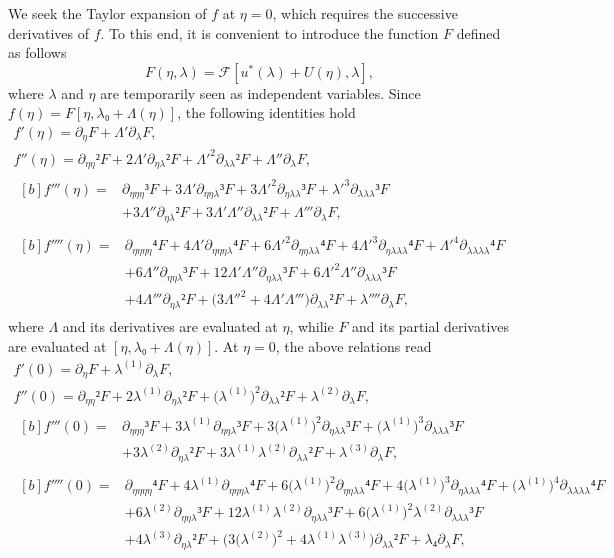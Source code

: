 \documentclass[12pt, final]{scrartcl}
\theoremstyle{definition}
\newcommand{\order}[2][1]{#2^{(#1)}}
\begin{document}
We seek the Taylor expansion of \(f\) at \(η = 0\), which requires the
successive derivatives of \(f\). To this end, it is convenient to introduce the
function \(F\) defined as follows
\begin{equation*}
  F(η, λ) =\mathcal{F}[u^{\ast}(λ) + U(η), λ],
\end{equation*}
where \(λ\) and \(η\) are temporarily seen as independent variables. Since
\(f(η) = F[η, λ₀ + Λ(η)]\), the following identities hold
\begin{gather*}
  f'(η) = ∂_{η} F + Λ' ∂_{λ} F,\\
  f''(η) = ∂_{ηη}² F + 2Λ' ∂_{ηλ}²F + Λ'^2 ∂_{λλ}² F + Λ'' ∂_{λ} F,\\
  \begin{aligned}[b]
    f'''(η) ={}
    & ∂_{ηηη}³ F + 3Λ' ∂_{ηηλ}³F + 3Λ'^2 ∂_{ηλλ}³F + λ'^3 ∂_{λλλ}³ F\\
    & + 3Λ'' ∂_{ηλ}² F + 3Λ' Λ'' ∂_{λ λ}² F + Λ''' ∂_{λ} F,
  \end{aligned}\\
  \begin{aligned}[b]
    f''''(η) ={}
    & ∂_{ηηηη}⁴ F + 4Λ' ∂_{ηηηλ}⁴F + 6Λ'^2 ∂_{ηηλλ}⁴F + 4Λ'^3 ∂_{ηλλλ}⁴F + Λ'^4 ∂_{λλλλ}⁴ F\\
    & + 6Λ'' ∂_{ηηλ}³ F + 12Λ' Λ'' ∂_{ηλλ}³F + 6Λ'^2 Λ'' ∂_{λλλ}³ F\\
    & + 4 Λ''' ∂_{ηλ}² F + \bigl( 3Λ''^2 + 4 Λ' Λ''' \bigr) ∂_{λλ}² F + λ'''' ∂_{λ}F,
  \end{aligned}
\end{gather*}
where \(Λ\) and its derivatives are evaluated at \(η\), whilie \(F\) and its
partial derivatives are evaluated at \([η, λ₀ + Λ(η)]\). At \(η = 0\), the above
relations read
\begin{gather}
  \label{eq:20220107060454}
  f'(0) = ∂_{η} F + \order[1]λ ∂_{λ} F,\\
  \label{eq:20220107124311}
  f''(0) = ∂_{ηη}² F + 2 \order[1]λ ∂_{ηλ}² F + \bigl( \order[1]λ \bigr)^2 ∂_{λλ}² F + \order[2]λ ∂_{λ} F,\\
  \label{eq:20220107060500}
  \begin{aligned}[b]
    f'''(0) ={}
    & ∂_{ηηη}³ F + 3 \order[1]λ ∂_{ηηλ}³ F + 3 \bigl( \order[1]λ \bigr)^2 ∂_{ηλλ}³ F + \bigl( \order[1]λ \bigr)^3 ∂_{λλλ}³ F\\
    & + 3 \order[2]λ ∂_{ηλ}² F + 3 \order[1]λ \order[2]λ ∂_{λλ}² F + \order[3]λ ∂_{λ} F,
  \end{aligned}\\
  \label{eq:20220602185935}
  \begin{aligned}[b]
    f''''(0) ={}
    & ∂_{ηηηη}⁴F + 4 \order[1]λ ∂_{ηηηλ}⁴ F + 6 \bigl( \order[1]λ \bigr)^2 ∂_{ηηλλ}⁴ F + 4 \bigl( \order[1]λ \bigr)^3 ∂_{ηλλλ}⁴ F + \bigl( \order[1]λ \bigr)^4 ∂_{λλλλ}⁴ F\\
    & + 6 \order[2]λ ∂_{ηηλ}³ F + 12 \order[1]λ \order[2]λ ∂_{ηλλ}³ F + 6 \bigl( \order[1]λ \bigr)^2 \order[2]λ ∂_{λλλ}³ F\\
    & + 4 \order[3]λ ∂_{ηλ}² F + \bigl(3 \bigl( \order[2]λ \bigr)^2 + 4 \order[1]λ \order[3]λ\bigr) ∂_{λλ}² F + λ₄ ∂_{λ} F,
  \end{aligned}
\end{gather}
\end{document}
